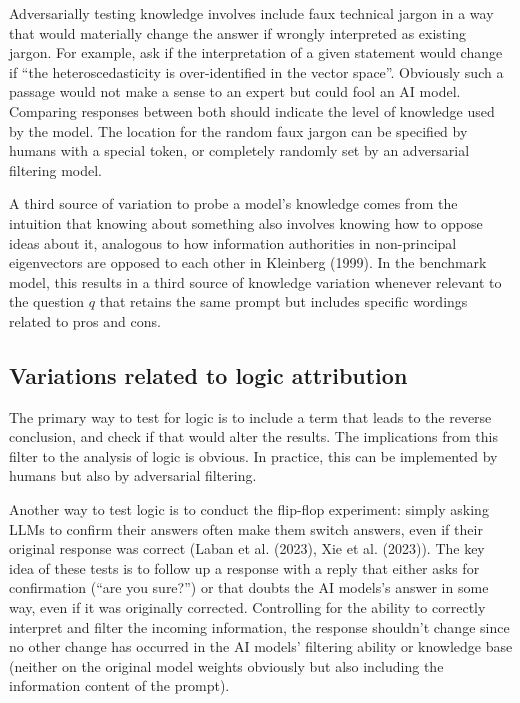 \documentclass[
]{article}
\theoremstyle{plain}
\theoremstyle{definition}
\theoremstyle{remark}
\begin{document}
Adversarially testing knowledge involves include faux technical jargon
in a way that would materially change the answer if wrongly interpreted
as existing jargon. For example, ask if the interpretation of a given
statement would change if ``the heteroscedasticity is over-identified in
the vector space''. Obviously such a passage would not make a sense to
an expert but could fool an AI model. Comparing responses between both
should indicate the level of knowledge used by the model. The location
for the random faux jargon can be specified by humans with a special
token, or completely randomly set by an adversarial filtering model.

A third source of variation to probe a model's knowledge comes from the
intuition that knowing about something also involves knowing how to
oppose ideas about it, analogous to how information authorities in
non-principal eigenvectors are opposed to each other in Kleinberg
(1999). In the benchmark model, this results in a third source of
knowledge variation whenever relevant to the question \(q\) that retains
the same prompt but includes specific wordings related to pros and cons.

\subsection{Variations related to logic
attribution}\label{variations-related-to-logic-attribution}

The primary way to test for logic is to include a term that leads to the
reverse conclusion, and check if that would alter the results. The
implications from this filter to the analysis of logic is obvious. In
practice, this can be implemented by humans but also by adversarial
filtering.

Another way to test logic is to conduct the flip-flop experiment: simply
asking LLMs to confirm their answers often make them switch answers,
even if their original response was correct (Laban et al. (2023), Xie et
al. (2023)). The key idea of these tests is to follow up a response with
a reply that either asks for confirmation (``are you sure?'') or that
doubts the AI models's answer in some way, even if it was originally
corrected. Controlling for the ability to correctly interpret and filter
the incoming information, the response shouldn't change since no other
change has occurred in the AI models' filtering ability or knowledge
base (neither on the original model weights obviously but also including
the information content of the prompt).
\end{document}
